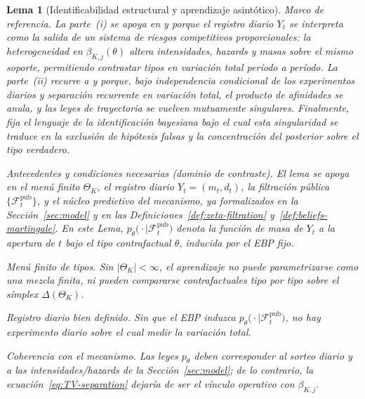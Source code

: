 \documentclass[pdflatex,sn-mathphys-ay]{sn-jnl}
\theoremstyle{thmstyleone}
\newtheorem{lemma}[theorem]{Lema}
\theoremstyle{thmstyletwo}
\theoremstyle{thmstylethree}
\newcommand{\ThetaK}{\Theta_K}
\newcommand{\1}{\mathbf{1}}
\begin{document}
\begin{lemma}[Identificabilidad estructural y aprendizaje asintótico]\label{lem:hazard-separation}
\normalfont
Marco de referencia. La parte~\textup{(i)} se apoya en \citet{Cox1972} y \citet{Bradburn2003} porque el registro diario $Y_t$ se interpreta como la salida de un sistema de riesgos competitivos proporcionales: la heterogeneidad en $\beta_{K,j}(\theta)$ altera intensidades, hazards y masas sobre el mismo soporte, permitiendo contrastar tipos en variación total período a período. La parte~\textup{(ii)} recurre a \citet{Kakutani1948} y \citet{Shiryaev2019Probability} porque, bajo independencia condicional de los experimentos diarios y separación recurrente en variación total, el producto de afinidades se anula, y las leyes de trayectoria se vuelven mutuamente singulares. Finalmente, \citet{Schervish1995Theory} fija el lenguaje de la identificación bayesiana bajo el cual esta singularidad se traduce en la exclusión de hipótesis falsas y la concentración del posterior sobre el tipo verdadero.

\medskip
\noindent Antecedentes y condiciones necesarias \textup{(}dominio de contraste\textup{)}.
El lema se apoya en el menú finito $\ThetaK$, el registro diario $Y_t=(m_t,d_t)$, la filtración pública $\{\mathcal{F}_t^{\mathrm{pub}}\}$, y el núcleo predictivo del mecanismo, ya formalizados en la Sección~\ref{sec:model} y en las Definiciones~\ref{def:zeta-filtration} y~\ref{def:beliefs-martingale}. En este Lema, $p_\theta\bigl(\cdot\mid \mathcal{F}_t^{\mathrm{pub}}\bigr)$ denota la función de masa de $Y_t$ a la apertura de $t$ bajo el tipo contrafactual $\theta$, inducida por el EBP fijo.
\begin{list}{}{%
  \setlength{\leftmargin}{2.25em}%
  \setlength{\labelwidth}{2.25em}%
  \setlength{\labelsep}{0.45em}%
  \setlength{\itemsep}{0.35em}%
  \setlength{\parsep}{0pt}%
  \setlength{\topsep}{0.25em}%
}
\item[\textup{(N1)}] \textup{Menú finito de tipos.}\quad
Sin $\lvert\ThetaK\rvert<\infty$, el aprendizaje no puede parametrizarse como una mezcla finita, ni pueden compararse contrafactuales tipo por tipo sobre el símplex $\Delta(\ThetaK)$.
\item[\textup{(N2)}] \textup{Registro diario bien definido.}\quad
Sin que el EBP induzca $p_\theta\bigl(\cdot\mid\mathcal{F}_t^{\mathrm{pub}}\bigr)$, no hay experimento diario sobre el cual medir la variación total.
\item[\textup{(N3)}] \textup{Coherencia con el mecanismo.}\quad
Las leyes $p_\theta$ deben corresponder al sorteo diario y a las intensidades/hazards de la Sección~\ref{sec:model}; de lo contrario, la ecuación~\eqref{eq:TV-separation} dejaría de ser el vínculo operativo con $\beta_{K,j}$.
\end{list}


\end{lemma}
\end{document}
